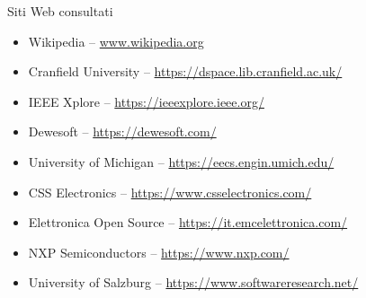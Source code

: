 \cleardoublepage
{}
{}
\nocite{*}


%

\vspace{2.5cm}
\begin{Large}Siti Web consultati\end{Large}
\begin{itemize}
    \item Wikipedia -- \url{www.wikipedia.org}
    \item Cranfield University -- \url{https://dspace.lib.cranfield.ac.uk/}
    \item IEEE Xplore -- \url{https://ieeexplore.ieee.org/}
    \item Dewesoft -- \url{https://dewesoft.com/}
    \item University of Michigan -- \url{https://eecs.engin.umich.edu/}
    \item CSS Electronics -- \url{https://www.csselectronics.com/}
    \item Elettronica Open Source -- \url{https://it.emcelettronica.com/}
    \item NXP Semiconductors -- \url{https://www.nxp.com/}
    \item University of Salzburg -- \url{https://www.softwareresearch.net/}
\end{itemize}

